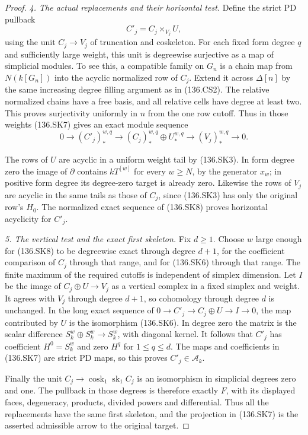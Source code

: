 \begin{proof}
\emph{4. The actual replacements and their horizontal test.}
Define the strict PD pullback
\[
                 C'_j=C_j\times_{V_j}U,                    \tag{136.SK7}
\]
using the unit $C_j\to V_j$ of truncation and coskeleton.
For each fixed form degree $q$ and sufficiently large weight,
this unit is degreewise surjective as a map of simplicial
modules. To see this, a compatible family on $G_n$ is a
chain map from $N(k[G_n])$ into the acyclic normalized row
of $C_j$. Extend it across $\Delta[n]$ by the same increasing
degree filling argument as in (136.CS2). The relative
normalized chains have a free basis, and all relative cells
have degree at least two. This proves surjectivity uniformly
in $n$ from the one row cutoff.
Thus in those weights (136.SK7) gives an exact module sequence
\[
       0\longrightarrow (C'_j)_*^{w,q}
       \longrightarrow (C_j)_*^{w,q}\oplus U_*^{w,q}
       \longrightarrow (V_j)_*^{w,q}\longrightarrow0.
                                                               \tag{136.SK8}
\]

The rows of $U$ are acyclic in a uniform weight tail by
(136.SK3). In form degree zero the image of $\partial$
contains $kT^{[w]}$ for every $w\ge N$, by the generator
$x_w$; in positive form degree its degree-zero target is
already zero. Likewise the rows of $V_j$ are acyclic in
the same tails as those of $C_j$, since (136.SK3) has only
the original row's $H_0$. The normalized exact sequence of
(136.SK8) proves horizontal acyclicity for $C'_j$.

\emph{5. The vertical test and the exact first skeleton.}
Fix $d\ge1$. Choose $w$ large enough for (136.SK8) to be
degreewise exact through degree $d+1$, for the coefficient
comparison of $C_j$ through that range, and for (136.SK6)
through that range. The finite maximum of the required
cutoffs is independent of simplex dimension.
Let $I$ be the image of $C_j\oplus U\to V_j$ as a vertical
complex in a fixed simplex and weight. It agrees with $V_j$
through degree $d+1$, so cohomology through degree $d$ is
unchanged. In the long exact sequence of
$0\to C'_j\to C_j\oplus U\to I\to0$, the map contributed
by $U$ is the isomorphism (136.SK6). In degree zero the
matrix is the scalar difference $S_k^w\oplus S_k^w\to S_k^w$,
with diagonal kernel. It follows that $C'_j$ has coefficient
$H^0=S_k^w$ and zero $H^q$ for $1\le q\le d$.
The maps and coefficients in (136.SK7) are strict PD maps,
so this proves $C'_j\in\mathcal A_k$.

Finally the unit $C_j\to\operatorname{cosk}_1\operatorname{sk}_1C_j$
is an isomorphism in simplicial degrees zero and one.
The pullback in those degrees is therefore exactly $F$,
with its displayed faces, degeneracy, products, divided
powers and differential. Thus all the replacements have
the same first skeleton, and the projection in (136.SK7)
is the asserted admissible arrow to the original target.
\end{proof}

